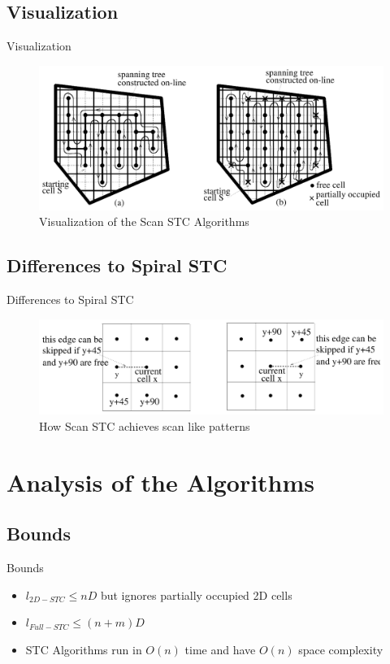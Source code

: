 \documentclass{beamer}
\begin{document}
\subsection{Visualization}
\begin{frame}{Visualization}
    \begin{figure}
        \includegraphics[width=\linewidth]{Images/inv_fig7.png}
        \caption{Visualization of the Scan STC Algorithms}
    \end{figure}
\end{frame}
\subsection{Differences to Spiral STC}
\begin{frame}{Differences to Spiral STC}
    \begin{figure}
        \includegraphics[width=\linewidth]{Images/inv_fig6.png}
        \caption{How Scan STC achieves scan like patterns}
    \end{figure}
\end{frame}

\section{Analysis of the Algorithms}
\subsection{Bounds}
\begin{frame}{Bounds}
    \begin{itemize}
        \item $l_{2D-STC} \leq nD$ but ignores partially occupied 2D cells
        \item $l_{Full-STC} \leq (n + m)D$
        \item STC Algorithms run in $O(n)$ time and have $O(n)$ space complexity
    \end{itemize}
\end{frame}
\end{document}
